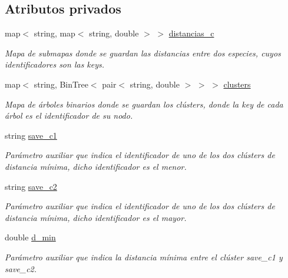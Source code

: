 \subsection*{Atributos privados}
\begin{DoxyCompactItemize}
\item 
map$<$ string, map$<$ string, double $>$ $>$ \hyperlink{class_cjt___clusters_a2b912c7987fd370bdeaf5dabb966240f}{distancias\+\_\+c}
\begin{DoxyCompactList}\small\item\em Mapa de submapas donde se guardan las distancias entre dos especies, cuyos identificadores son las keys. \end{DoxyCompactList}\item 
map$<$ string, Bin\+Tree$<$ pair$<$ string, double $>$ $>$ $>$ \hyperlink{class_cjt___clusters_a866c5a14f8f50598be2af9fd8c115dd2}{clusters}
\begin{DoxyCompactList}\small\item\em Mapa de árboles binarios donde se guardan los clústers, donde la key de cada árbol es el identificador de su nodo. \end{DoxyCompactList}\item 
string \hyperlink{class_cjt___clusters_af010e61859190999fb23f1854f4d23aa}{save\+\_\+c1}
\begin{DoxyCompactList}\small\item\em Parámetro auxiliar que indica el identificador de uno de los dos clústers de distancia mínima, dicho identificador es el menor. \end{DoxyCompactList}\item 
string \hyperlink{class_cjt___clusters_a1406c60345958da0016fa3c0b1cd89f5}{save\+\_\+c2}
\begin{DoxyCompactList}\small\item\em Parámetro auxiliar que indica el identificador de uno de los dos clústers de distancia mínima, dicho identificador es el mayor. \end{DoxyCompactList}\item 
double \hyperlink{class_cjt___clusters_a1b94b5f25778ee95796a9be966f1c619}{d\+\_\+min}
\begin{DoxyCompactList}\small\item\em Parámetro auxiliar que indica la distancia mínima entre el clúster save\+\_\+c1 y save\+\_\+c2. \end{DoxyCompactList}\end{DoxyCompactItemize}



